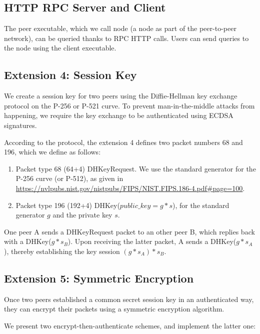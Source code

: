 \documentclass[12pt,a4paper]{article}
\begin{document}
        
\subsection{HTTP RPC Server and Client}\label{RPC}
The peer executable, which we call node (a node as part of the peer-to-peer network), can be queried thanks to RPC HTTP calls. Users can send queries to the node using the client executable.

\subsection{Extension 4: Session Key}
We create a session key for two peers using the Diffie-Hellman key exchange protocol on the P-256 or P-521 curve. To prevent man-in-the-middle attacks from happening, we require the key exchange to be authenticated using ECDSA signatures.

According to the protocol, the extension 4 defines two packet numbers 68 and 196, which we define as follows:

\begin{enumerate}
\item Packet type 68 (64+4) DHKeyRequest. We use the standard generator for the P-256 curve (or P-512), as given in \url{https://nvlpubs.nist.gov/nistpubs/FIPS/NIST.FIPS.186-4.pdf#page=100}.
  \item Packet type 196 (192+4) DHKey($public\_key=g * s$), for the standard generator $g$ and the private key $s$.
  \end{enumerate}

 One peer A sends a DHKeyRequest packet to an other peer B, which replies back with a DHKey($g * s_B$). Upon receiving the latter packet, A sends a DHKey($g * s_A$), thereby establishing the key session $(g * s_A) * s_B$.


 \subsection{Extension 5: Symmetric Encryption}
 Once two peers established a common secret session key in an authenticated way, they can encrypt their packets using a symmetric encryption algorithm.

 We present two encrypt-then-authenticate schemes, and implement the latter one:
\end{document}
